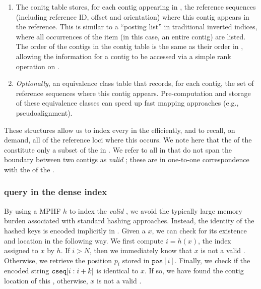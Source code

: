 \begin{enumerate}
\item The conitg table \ctab stores, for each contig appearing in \cseq, the reference
  sequences (including reference ID, offset and orientation) where this contig appears in the
  reference. This is similar to a ``posting list'' in traditional inverted
  indices, where all occurrences of the item (in this case, an entire \ccdbg
  contig) are listed. The order of the contigs in the contig table is the same
  as their order in \cseq, allowing the information for a contig to be accessed
  via a simple rank operation on \bv. 

\label{items:dense5}

\item \emph{Optionally}, an equivalence class table that records, for each
  contig, the set of reference sequences where this contig appears.
  Pre-computation and storage of these equivalence classes can speed up fast
  mapping approaches (e.g., pseudoalignment).

\end{enumerate}

These structures allow us to index every \kmer in the \ccdbg efficiently, and to
recall, on demand, all of the reference loci where this \kmer occurs. We note
here that the \kmers of the \ccdbg constitute only a subset of the \kmers in
\cseq. We refer to all \kmers in \cseq that do not span the boundary between two
contigs as \emph{valid} \kmers; these are in one-to-one correspondence with the
\kmers of the \ccdbg.

\subsubsection*{\kmer query in the dense \pufferfish index}
By using a MPHF $h$ to index the \emph{valid} \kmers, we avoid the typically
large memory burden associated with standard hashing approaches. Instead, the
identity of the hashed keys is encoded implicitly in \cseq. Given a \kmer $x$, we
can check for its existence and location in the following way. We first compute
$i = h(x)$, the index assigned to \kmer $x$ by $h$. If $i > N$, then we
immediately know that $x$ is not a valid \kmer. Otherwise, we retrieve the
position $p_{i}$ stored in $\texttt{pos}[i]$. Finally, we check if the encoded
string $\texttt{cseq}[i:i+k]$ is identical to $x$. If so, we have found the
contig location of this \kmer, otherwise, $x$ is not a valid \kmer. 

